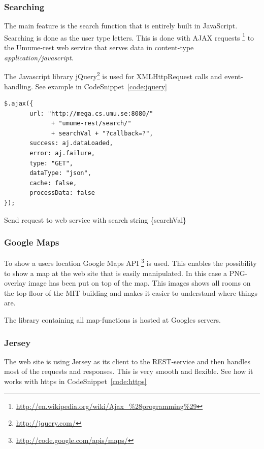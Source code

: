 \documentclass[titlepage, twocolumn, a4paper, 10pt]{article}
\begin{document}
\subsubsection{Searching}\label{sec:web-search}
The main feature is the search function that is entirely built
in JavaScript. Searching is done as the user type letters. This
is done with AJAX requests
\footnote{\url{http://en.wikipedia.org/wiki/Ajax_\%28programming\%29}}
to the Umume-rest web service that serves data in content-type
\textit{application/javascript}.

The Javascript library jQuery\footnote{\url{http://jquery.com/}} is
used for XMLHttpRequest calls and event-handling. See example in
CodeSnippet~\ref{code:jquery}

\begin{code}
  \begin{footnotesize}
\begin{verbatim}
$.ajax({
       url: "http://mega.cs.umu.se:8080/"
             + "umume-rest/search/"
             + searchVal + "?callback=?",
       success: aj.dataLoaded,
       error: aj.failure,
       type: "GET",
       dataType: "json",
       cache: false,
       processData: false
});
\end{verbatim}
  \end{footnotesize}
  \caption{Send request to web service with search string \{searchVal\}}\label{code:jquery}
\end{code}

\subsubsection{Google Maps}\label{sec:googlemaps}
To show a users location Google Maps API
\footnote{\url{http://code.google.com/apis/maps/}} is used.
This enables the possibility to show a map at the web site that is
easily manipulated. In this case a PNG-overlay image has been
put on top of the map. This images shows all rooms on the top
floor of the MIT building and makes it easier to understand where
things are.

The library containing all map-functions is hosted at Googles
servers.

\subsubsection{Jersey}
The web site is using Jersey as its client to the REST-service and
then handles most of the requests and responses. This is very smooth
and flexible. See how it works with https in CodeSnippet~\ref{code:https}
\end{document}
